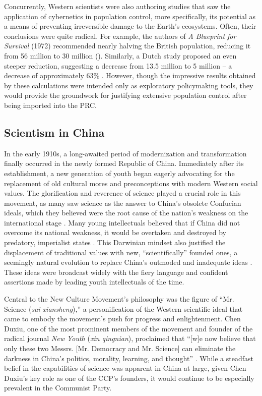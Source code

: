 Concurrently, Western scientists were also authoring studies that saw the application of cybernetics in population control, more specifically, its potential as a means of preventing irreversible damage to the Earth’s ecosystems. Often, their conclusions were quite radical. For example, the authors of \emph{A Blueprint for Survival} (1972) recommended nearly halving the British population, reducing it from 56 million to 30 million (\cites{Goldsmith1972}[p.\ 133]{Greenhalgh2008JustOneChild}[p.\ 359]{Kwakernaak1977}). Similarly, a Dutch study proposed an even steeper reduction, suggesting a decrease from 13.5 million to 5 million – a decrease of approximately 63\% \autocite[p.\ 359]{Kwakernaak1977}. However, though the impressive results obtained by these calculations were intended only as exploratory policymaking tools, they would provide the groundwork for justifying extensive population control after being imported into the PRC.

\subsection{Scientism in China}

In the early 1910s, a long-awaited period of modernization and transformation finally occurred in the newly formed Republic of China. Immediately after its establishment, a new generation of youth began eagerly advocating for the replacement of old cultural mores and preconceptions with modern Western social values. The glorification and reverence of science played a crucial role in this movement, as many saw science as the answer to China’s obsolete Confucian ideals, which they believed were the root cause of the nation’s weakness on the international stage \autocite[pp.\ 76--78]{Lee1987IronHouse}. Many young intellectuals believed that if China did not overcome its national weakness, it would be overtaken and destroyed by predatory, imperialist states \autocite[p.\ 34]{Uberoi1968Scientism}. This Darwinian mindset also justified the displacement of traditional values with new, “scientifically” founded ones, a seemingly natural evolution to replace China’s outmoded and inadequate ideas \autocite{Uberoi1968Scientism}. These ideas were broadcast widely with the fiery language and confident assertions made by leading youth intellectuals of the time.

Central to the New Culture Movement’s philosophy was the figure of “Mr. Science (\emph{sai xiansheng}),” a personification of the Western scientific ideal that came to embody the movement’s push for progress and enlightenment. Chen Duxiu, one of the most prominent members of the movement and founder of the radical journal \emph{New Youth} (\emph{xin qingnian}), proclaimed that “[w]e now believe that only these two Messrs. [Mr. Democracy and Mr. Science] can eliminate the darkness in China’s politics, morality, learning, and thought” \autocite[p.\ 280]{Fan2022MrScience}. While a steadfast belief in the capabilities of science was apparent in China at large, given Chen Duxiu's key role as one of the CCP’s founders, it would continue to be especially prevalent in the Communist Party.

